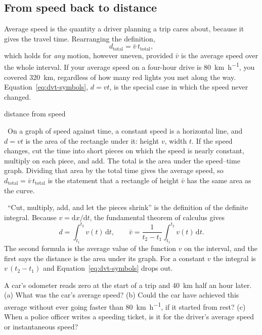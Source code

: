 \documentclass[11pt,twoside,openany]{book}
\newcommand{\dd}{\mathrm{d}}
\newcounter{check}[chapter]
\newcommand{\viewtag}[3]{\fcolorbox{#2}{#3}{\footnotesize\textbf{\textcolor{#2}{#1}}}}
\newcommand{\elemtag}{\viewtag{Elementary}{elemcol}{elempale}}
\newcommand{\calctag}{\viewtag{Calculus}{calccol}{calcpale}}
\newcommand{\elem}{\par\medskip\noindent\elemtag\ }
\newcommand{\calc}{\par\medskip\noindent\calctag\ }
\begin{document}
\subsection{From speed back to distance}

Average speed is the quantity a driver planning a trip cares about, because it gives the travel time. Rearranging the definition,
\[
d_{\text{total}} = \bar v\, t_{\text{total}},
\]
which holds for \emph{any} motion, however uneven, provided $\bar v$ is the average speed over the whole interval. If your average speed on a four-hour drive is \SI{80}{\kilo\metre\per\hour}, you covered \SI{320}{\kilo\metre}, regardless of how many red lights you met along the way. Equation~\eqref{eq:dvt-symbols}, $d = vt$, is the special case in which the speed never changed.

\begin{twoviews}{distance from speed}
\elem On a graph of speed against time, a constant speed is a horizontal line, and $d = vt$ is the area of the rectangle under it: height $v$, width $t$. If the speed changes, cut the time into short pieces on which the speed is nearly constant, multiply on each piece, and add. The total is the area under the speed--time graph. Dividing that area by the total time gives the average speed, so $d_{\text{total}} = \bar v\,t_{\text{total}}$ is the statement that a rectangle of height $\bar v$ has the same area as the curve.

\calc ``Cut, multiply, add, and let the pieces shrink'' is the definition of the definite integral. Because $v = \dd x/\dd t$, the fundamental theorem of calculus gives
\begin{equation}
d = \int_{t_1}^{t_2} v(t)\,\dd t,
\qquad
\bar v = \frac{1}{t_2 - t_1}\int_{t_1}^{t_2} v(t)\,\dd t.
\label{eq:integral}
\end{equation}
The second formula is the average value of the function $v$ on the interval, and the first says the distance is the area under its graph. For a constant $v$ the integral is $v\,(t_2 - t_1)$ and Equation~\eqref{eq:dvt-symbols} drops out.
\end{twoviews}

\begin{checkbox}
A car's odometer reads zero at the start of a trip and \SI{40}{\kilo\metre} half an hour later. (a) What was the car's average speed? (b) Could the car have achieved this average without ever going faster than \SI{80}{\kilo\metre\per\hour}, if it started from rest? (c) When a police officer writes a speeding ticket, is it for the driver's average speed or instantaneous speed?
\end{checkbox}
\end{document}
